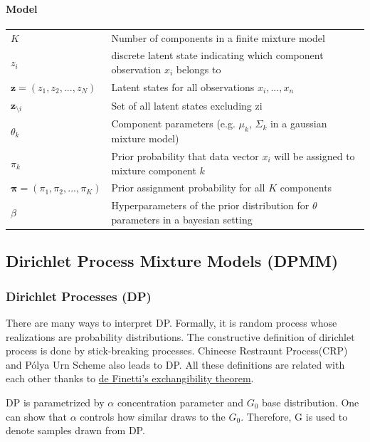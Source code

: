 \documentclass[a4paper]{article}
\begin{document}
\paragraph{Model}
\begin{center}
\begin{tabular}{|l|l|} \hline
$K$ & Number of components in a finite mixture model \\
$z_i$ & discrete latent state indicating which component observation $x_i$ belongs to \\
$\mathbf{z} = (z_1, z_2,...,z_N)$ & Latent states for all observations $x_i,..., x_n$\\
$\mathbf{z}_{\setminus i}$ & Set of all latent states excluding zi\\
$\theta_k$  & Component parameters (e.g. $\mu_k$, $\Sigma_k$ in a gaussian mixture model)  \\
$\pi_k$ & Prior probability that data vector $x_i$ will be assigned to mixture component $k$ \\
$\mathbf{\pi} = (\pi_1,\pi_2,...,\pi_K)$ & Prior assignment probability for all $K$ components \\
$\beta$ & Hyperparameters of the prior distribution for $\theta$ parameters in a bayesian setting \\ \hline
\end{tabular}
\end{center}


\subsection{Dirichlet Process Mixture Models (DPMM)}

\subsubsection{Dirichlet Processes (DP)}

There are many ways to interpret DP. Formally, it is random process
whose realizations are probability distributions. The constructive
definition of dirichlet process is done by stick-breaking processes.
Chineese Restraunt Process(CRP) and Pólya Urn Scheme also leads to DP.
All these definitions are related with each other thanks to
\href{https://en.wikipedia.org/wiki/De_Finetti\%27s_theorem}{de
Finetti's exchangibility theorem}.

DP is parametrized by \(\alpha\) concentration parameter and \(G_0\)
base distribution. One can show that \(\alpha\) controls how similar
draws to the \(G_0\). Therefore, G is used to denote samples drawn from
DP.
\end{document}
